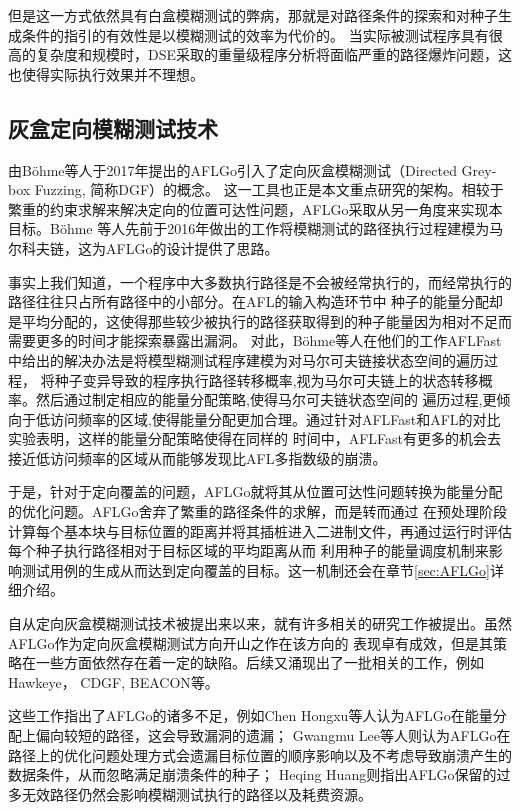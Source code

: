 \documentclass[bachelor]{njupthesis}
\begin{document}
但是这一方式依然具有白盒模糊测试的弊病，那就是对路径条件的探索和对种子生成条件的指引的有效性是以模糊测试的效率为代价的。
当实际被测试程序具有很高的复杂度和规模时，DSE采取的重量级程序分析将面临严重的路径爆炸问题，这也使得实际执行效果并不理想。

\subsection{灰盒定向模糊测试技术}\label{sec:DGF}
由B{\"o}hme等人于2017年提出的AFLGo\cite{bohmeDGF2017}引入了定向灰盒模糊测试（Directed Grey-box Fuzzing, 简称DGF）的概念。
这一工具也正是本文重点研究的架构。相较于繁重的约束求解来解决定向的位置可达性问题，AFLGo采取从另一角度来实现本目标。B{\"o}hme
等人先前于2016年做出的工作\cite{2016Coverage}将模糊测试的路径执行过程建模为马尔科夫链，这为AFLGo的设计提供了思路。

事实上我们知道，一个程序中大多数执行路径是不会被经常执行的，而经常执行的路径往往只占所有路径中的小部分。在AFL的输入构造环节中
种子的能量分配却是平均分配的，这使得那些较少被执行的路径获取得到的种子能量因为相对不足而需要更多的时间才能探索暴露出漏洞。
对此，Böhme等人在他们的工作AFLFast\cite{2016Coverage}中给出的解决办法是将模型糊测试程序建模为对马尔可夫链接状态空间的遍历过程，
将种子变异导致的程序执行路径转移概率,视为马尔可夫链上的状态转移概率。然后通过制定相应的能量分配策略,使得马尔可夫链状态空间的
遍历过程,更倾向于低访问频率的区域,使得能量分配更加合理。通过针对AFLFast和AFL的对比实验表明，这样的能量分配策略使得在同样的
时间中，AFLFast有更多的机会去接近低访问频率的区域从而能够发现比AFL多指数级的崩溃\cite{2016Coverage}。

于是，针对于定向覆盖的问题，AFLGo就将其从位置可达性问题转换为能量分配的优化问题。AFLGo舍弃了繁重的路径条件的求解，而是转而通过
在预处理阶段计算每个基本块与目标位置的距离并将其插桩进入二进制文件，再通过运行时评估每个种子执行路径相对于目标区域的平均距离从而
利用种子的能量调度机制来影响测试用例的生成从而达到定向覆盖的目标。这一机制还会在章节\ref{sec:AFLGo}详细介绍。

自从定向灰盒模糊测试技术被提出来以来，就有许多相关的研究工作被提出。虽然AFLGo作为定向灰盒模糊测试方向开山之作在该方向的
表现卓有成效，但是其策略在一些方面依然存在着一定的缺陷。后续又涌现出了一批相关的工作，例如Hawkeye\cite{chen2018hawkeye}， 
CDGF\cite{lee2021constraint}, BEACON\cite{huang2022beacon}等。

这些工作指出了AFLGo的诸多不足，例如Chen Hongxu等人认为AFLGo在能量分配上偏向较短的路径，这会导致漏洞的遗漏\cite{chen2018hawkeye}；
Gwangmu Lee等人则认为AFLGo在路径上的优化问题处理方式会遗漏目标位置的顺序影响以及不考虑导致崩溃产生的数据条件，从而忽略满足崩溃条件的种子\cite{lee2021constraint}；
Heqing Huang则指出AFLGo保留的过多无效路径仍然会影响模糊测试执行的路径以及耗费资源\cite{huang2022beacon}。
\end{document}

